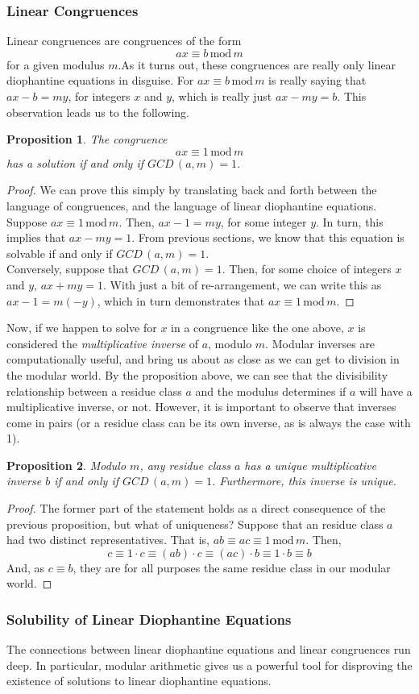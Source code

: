\documentclass{article}
\newtheorem{prop}{Proposition}
\newcommand{\X}[1]{\, \text{mod} \, #1}
\newcommand{\GCD}[2]{GCD\,(#1, #2)}
\begin{document}
\subsubsection*{Linear Congruences} 
Linear congruences are congruences of the form 
\[ax\equiv b \X{m}\]
for a given modulus $m$.As it turns out, these congruences are really only linear diophantine equations in disguise. For $ax\equiv b\X{m}$ is really saying that $ax - b = my$, for integers $x$ and $y$, which is really just $ax - my = b$. This observation leads us to the following. 
\begin{mdframed} 
\begin{prop} The congruence 
\[ax\equiv 1\X{m}\]
has a solution if and only if $\GCD{a}{m} = 1$. 
\end{prop}
\begin{proof} 
We can prove this simply by translating back and forth between the language of congruences, and the language of linear diophantine equations. 
Suppose $ax\equiv 1 \X{m}$. Then, $ax - 1 = my$, for some integer $y$. In turn, this implies that $ax - my = 1$. From previous sections, we know that this equation is solvable if and only if $\GCD{a}{m} = 1$.\\
Conversely, suppose that $\GCD{a}{m}=1$. Then, for some choice of integers $x$ and $y$, $ax + my = 1$. With just a bit of re-arrangement, we can write this as $ax - 1 = m(-y)$, which in turn demonstrates that $ax\equiv 1\X{m}$. 
\end{proof} 
\end{mdframed} 
Now, if we happen to solve for $x$ in a congruence like the one above, $x$ is considered the \textit{multiplicative inverse} of $a$, modulo $m$. Modular inverses are computationally useful, and bring us about as close as we can get to division in the modular world. By the proposition above, we can see that the divisibility relationship between a residue class $a$ and the modulus determines if $a$ will have a multiplicative inverse, or not. However, it is important to observe that inverses come in pairs (or a residue class can be its own inverse, as is always the case with 1). 
\begin{mdframed}
\begin{prop}
Modulo $m$, any residue class $a$ has a unique multiplicative inverse $b$ if and only if $\GCD{a}{m} = 1$. Furthermore, this inverse is unique. 
\end{prop} 
\begin{proof} 
The former part of the statement holds as a direct consequence of the previous proposition, but what of uniqueness? Suppose that an residue class $a$ had two distinct representatives. That is, $ab\equiv ac\equiv 1\X{m}$. Then, 
\[c \equiv 1\cdot c \equiv (ab)\cdot c \equiv (ac)\cdot b \equiv 1\cdot b \equiv b\]
And, as $c\equiv b$, they are for all purposes the same residue class in our modular world. 
\end{proof} 
\end{mdframed} 

\subsubsection*{Solubility of Linear Diophantine Equations} 
The connections between linear diophantine equations and linear congruences run deep. In particular, modular arithmetic gives us a powerful tool for disproving the existence of solutions to linear diophantine equations. 
\end{document}
